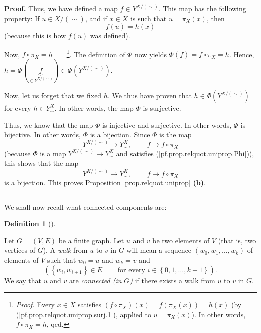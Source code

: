 \documentclass[numbers=enddot,12pt,final,onecolumn,notitlepage]{scrartcl}%
\theoremstyle{definition}
\newtheorem{defi}[theo]{Definition}
\newenvironment{definition}[1][]
{\begin{defi}[#1]\begin{leftbar}}
{\end{leftbar}\end{defi}}
\newenvironment{proof}[1][Proof]{\noindent\textbf{#1.} }{\ \rule{0.5em}{0.5em}}
\newenvironment{verlong}{}{}
\begin{document}
\begin{verlong}
\begin{proof}
Thus, we have defined a map $f\in Y^{X/\left(  \sim\right)  }$. This map has
the following property: If $u\in X/\left(  \sim\right)  $, and if $x\in X$ is
such that $u=\pi_{X}\left(  x\right)  $, then%
\begin{equation}
f\left(  u\right)  =h\left(  x\right)  \label{pf.prop.relquot.uniprop.surj.1}%
\end{equation}
(because this is how $f\left(  u\right)  $ was defined).

Now, $f\circ\pi_{X}=h$\ \ \ \ \footnote{\textit{Proof.} Every $x\in X$
satisfies $\left(  f\circ\pi_{X}\right)  \left(  x\right)  =f\left(  \pi
_{X}\left(  x\right)  \right)  =h\left(  x\right)  $ (by
(\ref{pf.prop.relquot.uniprop.surj.1}), applied to $u=\pi_{X}\left(  x\right)
$). In other words, $f\circ\pi_{X}=h$, qed.}. The definition of $\Phi$ now
yields $\Phi\left(  f\right)  =f\circ\pi_{X}=h$. Hence, $h=\Phi\left(
\underbrace{f}_{\in Y^{X/\left(  \sim\right)  }}\right)  \in\Phi\left(
Y^{X/\left(  \sim\right)  }\right)  $.

Now, let us forget that we fixed $h$. We thus have proven that $h\in
\Phi\left(  Y^{X/\left(  \sim\right)  }\right)  $ for every $h\in Y_{\sim}%
^{X}$. In other words, the map $\Phi$ is surjective.

Thus, we know that the map $\Phi$ is injective and surjective. In other words,
$\Phi$ is bijective. In other words, $\Phi$ is a bijection. Since $\Phi$ is
the map
\[
Y^{X/\left(  \sim\right)  }\rightarrow Y_{\sim}^{X}%
,\ \ \ \ \ \ \ \ \ \ f\mapsto f\circ\pi_{X}%
\]
(because $\Phi$ is a map $Y^{X/\left(  \sim\right)  }\rightarrow Y_{\sim}^{X}$
and satisfies (\ref{pf.prop.relquot.uniprop.Phi})), this shows that the map
\[
Y^{X/\left(  \sim\right)  }\rightarrow Y_{\sim}^{X}%
,\ \ \ \ \ \ \ \ \ \ f\mapsto f\circ\pi_{X}%
\]
is a bijection. This proves Proposition \ref{prop.relquot.uniprop}
\textbf{(b)}.
\end{proof}

We shall now recall what connected components are:
\end{verlong}

\begin{definition}
\label{def.path}Let $G=\left(  V,E\right)  $ be a finite graph. Let $u$ and
$v$ be two elements of $V$ (that is, two vertices of $G$). A \textit{walk}
from $u$ to $v$ in $G$ will mean a sequence $\left(  w_{0},w_{1},\ldots
,w_{k}\right)  $ of elements of $V$ such that $w_{0}=u$ and $w_{k}=v$ and%
\[
\left(  \left\{  w_{i},w_{i+1}\right\}  \in E\ \ \ \ \ \ \ \ \ \ \text{for
every }i\in\left\{  0,1,\ldots,k-1\right\}  \right)  .
\]
We say that $u$ and $v$ are \textit{connected (in }$G$\textit{)} if there
exists a walk from $u$ to $v$ in $G$.
\end{definition}
\end{document}
